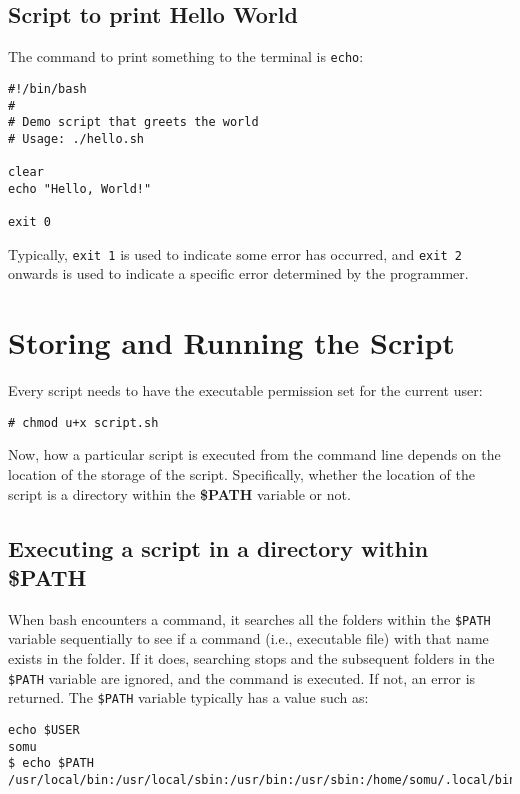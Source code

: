 \subsection{Script to print Hello World}	
The command to print something to the terminal is \verb|echo|:

\vspace{-15pt}
\begin{verbatim}
#!/bin/bash
#
# Demo script that greets the world
# Usage: ./hello.sh

clear
echo "Hello, World!"

exit 0
\end{verbatim}
\vspace{-10pt}	

\noindent
Typically, \verb|exit 1| is used to indicate some error has occurred, and \verb|exit 2| onwards is used to indicate a specific error determined by the programmer. 
	
\section{Storing and Running the Script}
Every script needs to have the executable permission set for the current user:

\vspace{-15pt}
\begin{verbatim}
# chmod u+x script.sh
\end{verbatim}
\vspace{-10pt}	

\noindent
Now, how a particular script is executed from the command line depends on the location of the storage of the script. Specifically, whether the location of the script is a directory within the \textbf{\$PATH} variable or not. 

\subsection{Executing a script in a directory within \$PATH}
When bash encounters a command, it searches all the folders within the \verb|$PATH| variable sequentially to see if a command (i.e., executable file) with that name exists in the folder. If it does, searching stops and the subsequent folders in the \verb|$PATH| variable are ignored, and the command is executed. If not, an error is returned. The \verb|$PATH| variable typically has a value such as:

\vspace{-15pt}
\begin{verbatim}
echo $USER
somu
$ echo $PATH
/usr/local/bin:/usr/local/sbin:/usr/bin:/usr/sbin:/home/somu/.local/bin:/home/somu/bin
\end{verbatim}
\vspace{-10pt}	

